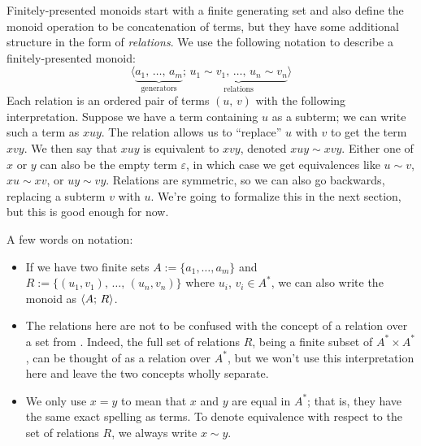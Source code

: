\documentclass[../generics]{subfiles}
\begin{document}
Finitely-presented monoids start with a finite generating set and also define the monoid operation to be concatenation of terms, but they have some additional structure in the form of \emph{relations}. We use the following notation to describe a finitely-presented monoid:
\[\langle \underbrace{a_1,\,\ldots,\, a_m}_{\text{generators}};\, \underbrace{u_1 \sim v_1,\,\ldots,\, u_n \sim v_n}_{\text{relations}}\rangle\]
Each relation is an ordered pair of terms $(u,\,v)$ with the following interpretation. Suppose we have a term containing $u$ as a subterm; we can write such a term as $xuy$. The relation allows us to ``replace'' $u$ with $v$ to get the term $xvy$. We then say that $xuy$ is equivalent to $xvy$, denoted $xuy\sim xvy$. Either one of $x$ or $y$ can also be the empty term $\varepsilon$, in which case we get equivalences like $u\sim v$, $xu\sim xv$, or $uy\sim vy$. Relations are symmetric, so we can also go backwards, replacing a subterm $v$ with $u$. We're going to formalize this in the next section, but this is good enough for now.

A few words on notation:
\begin{itemize}
\item If we have two finite sets $A := \{a_1,\ldots, a_m\}$ and $R := \{(u_1,v_1),\,\ldots,\,(u_n,v_n)\}$ where $u_i$, $v_i\in A^*$, we can also write the monoid as $\langle A;\,R\rangle$.
\item The relations here are not to be confused with the concept of a relation over a set from . Indeed, the full set of relations $R$, being a finite subset of $A^*\times A^*$, can be thought of as a relation over $A^*$, but we won't use this interpretation here and leave the two concepts wholly separate.
\item We only use $x=y$ to mean that $x$ and $y$ are equal in $A^*$; that is, they have the same exact spelling as terms. To denote equivalence with respect to the set of relations $R$, we always write $x\sim y$.
\end{itemize}
\end{document}
